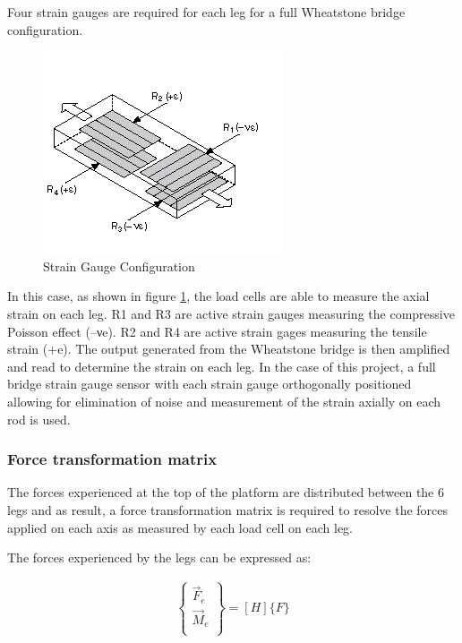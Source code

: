 Four strain gauges are required for each leg for a full Wheatstone bridge configuration. 
\begin{center}
	\begin{figure}[H]
		\centering
		\includegraphics{Figures/loadConf}
		\caption[Strain Gauge Configuration]{Strain Gauge Configuration \cite{noauthor_measuring_nodate}}
		\label{strain}
	\end{figure}
\end{center}
In this case, as shown in figure \ref{strain}, the load cells are able to measure the axial strain on each leg. R1 and R3 are active strain gauges measuring the compressive Poisson effect (–νe). R2 and R4 are active strain gages measuring the tensile strain (+e). The output generated from the Wheatstone bridge is then amplified and read to determine the strain on each leg.
In the case of this project, a full bridge strain gauge sensor with each strain gauge orthogonally positioned allowing for elimination of noise and measurement of the strain axially on each rod is used.

\subsubsection*{Force transformation matrix} 
The forces experienced at the top of the platform are distributed between the 6 legs and as result, a force transformation matrix is required to resolve the forces applied on each axis as measured by each load cell on each leg. 

The forces experienced by the legs can be expressed as:
\begin{ceqn}
\begin{align}
	\begin{Bmatrix}
		\vec{F}_e \\
		\vec{M}_e \\
	\end{Bmatrix} = [H]\{F\}
\end{align}
\end{ceqn}

